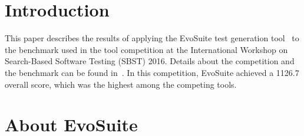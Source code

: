 \documentclass{sig-alternate}
\newcommand{\EVOSUITE}{{\sc EvoSuite}\xspace}
\begin{document}



\section{Introduction}

This paper describes the results of applying the \EVOSUITE test
generation tool~\cite{FrA11c} to the benchmark used in the tool
competition at the International Workshop on Search-Based Software
Testing (SBST) 2016.  Details about the competition and the benchmark
can be found in~\cite{sbst16competition}. 
In this competition, \EVOSUITE achieved a 1126.7 overall score, which was the highest among
the competing tools. 

\section{About EvoSuite}
\end{document}
